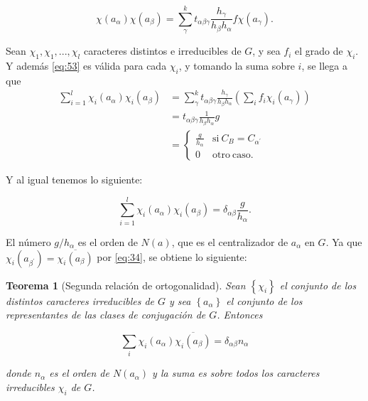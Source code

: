 \documentclass[12pt]{book}
\newtheorem{theorem}{Teorema}[section]
\theoremstyle{definition}
\newcounter{in}
\begin{document}
\begin{equation}
  \label{eq:53}
   \chi(a_{\alpha}) \chi(a_{\beta}) = \sum_{\gamma}^{k} t_{\alpha \beta \gamma} \frac{h_{\gamma}}{h_{\beta} h_{\alpha}} f \chi(a_{\gamma}).
\end{equation}

Sean $\chi_{1}, \chi_{1},..., \chi_{l}$ caracteres distintos e
irreducibles de $G$, y sea $f_{i}$ el grado de $\chi_{i}$. Y además
\ref{eq:53} es válida para cada $\chi_{i}$, y tomando la suma sobre
$i$, se llega a que
\begin{equation}
  \label{eq:54}
  \begin{aligned}
    \sum_{i=1}^{l} \chi_{i}(a_{\alpha}) \chi_{i}(a_{\beta}) &= \sum_{\gamma}^{k} t_{\alpha \beta \gamma} \frac{h_{\gamma}}{h_{\beta} h_{\alpha}} (\sum_{i} f_{i} \chi_{i}(a_{\gamma})) \\
    &= t_{\alpha \beta \gamma} \frac{1}{h_{\beta} h_{\alpha}}g \\
    &=  \left\{
	       \begin{array}{ll}
		 \frac{g}{h_{\alpha}}      & \mathrm{si\ } C_{B} = C_{\alpha^{'}} \\
		 0      & \mathrm{otro\ caso.\ } 
	       \end{array}
	     \right.
    \end{aligned}
\end{equation}

Y al igual tenemos lo siguiente:

\begin{equation}
  \label{eq:55}
   \sum_{i=1}^{l} \chi_{i}(a_{\alpha}) \chi_{i}(a_{\beta})=\delta_{\alpha \beta} \frac{g}{h_{\alpha}}.
\end{equation}

El número $g/h_{\alpha}$ es el orden de $N(a)$, que es el
centralizador de $a_{\alpha}$ en $G$. Ya que
$\chi_{i}(a_{\beta^{'}})=\overline{\chi_{i} (a_{\beta})}$ por
\ref{eq:34}, se obtiene lo siguiente:

\begin{theorem}[Segunda relación de ortogonalidad]
  \label{t4_9}
  Sean $\left\{\chi_{i} \right\}$ el conjunto de los distintos
  caracteres irreducibles de $G$ y sea $\left\{a_{\alpha} \right\}$ el
  conjunto de los representantes de las clases de conjugación de
  $G$. Entonces

\begin{equation*}
  \sum_{i} \chi_{i}(a_{\alpha}) \overline{\chi_{i} (a_{\beta})} = \delta_{\alpha \beta} n_{\alpha}
\end{equation*}

donde $n_{\alpha}$ es el orden de $N(a_{\alpha})$ y la suma es sobre
todos los caracteres irreducibles $\chi_{i}$ de $G$.
\end{theorem}
\end{document}
